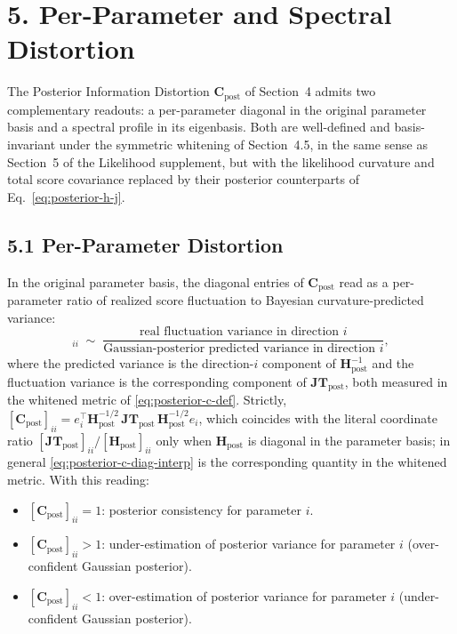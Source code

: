 \documentclass[11pt]{article}
\begin{document}
\section*{5. Per-Parameter and Spectral Distortion}

The Posterior Information Distortion $\mathbf C_{\mathrm{post}}$ of Section~4 admits two complementary readouts: a per-parameter diagonal in the original parameter basis and a spectral profile in its eigenbasis. Both are well-defined and basis-invariant under the symmetric whitening of Section~4.5, in the same sense as Section~5 of the Likelihood supplement, but with the likelihood curvature and total score covariance replaced by their posterior counterparts of Eq.~\eqref{eq:posterior-h-j}.

\subsection*{5.1 Per-Parameter Distortion}

In the original parameter basis, the diagonal entries of $\mathbf C_{\mathrm{post}}$ read as a per-parameter ratio of realized score fluctuation to Bayesian curvature-predicted variance:
\begin{equation}
[\mathbf C_{\mathrm{post}}]_{ii}
\;\sim\;
\frac{\text{real fluctuation variance in direction } i}
     {\text{Gaussian-posterior predicted variance in direction } i},
\label{eq:posterior-c-diag-interp}
\end{equation}
where the predicted variance is the direction-$i$ component of $\mathbf H_{\mathrm{post}}^{-1}$ and the fluctuation variance is the corresponding component of $\mathbf{JT}_{\mathrm{post}}$, both measured in the whitened metric of \eqref{eq:posterior-c-def}. Strictly, $[\mathbf C_{\mathrm{post}}]_{ii} = e_i^\top \mathbf H_{\mathrm{post}}^{-1/2}\, \mathbf{JT}_{\mathrm{post}}\, \mathbf H_{\mathrm{post}}^{-1/2} e_i$, which coincides with the literal coordinate ratio $[\mathbf{JT}_{\mathrm{post}}]_{ii}/[\mathbf H_{\mathrm{post}}]_{ii}$ only when $\mathbf H_{\mathrm{post}}$ is diagonal in the parameter basis; in general \eqref{eq:posterior-c-diag-interp} is the corresponding quantity in the whitened metric. With this reading:
\begin{itemize}
\item $[\mathbf C_{\mathrm{post}}]_{ii} = 1$: posterior consistency for parameter $i$.
\item $[\mathbf C_{\mathrm{post}}]_{ii} > 1$: under-estimation of posterior variance for parameter $i$ (over-confident Gaussian posterior).
\item $[\mathbf C_{\mathrm{post}}]_{ii} < 1$: over-estimation of posterior variance for parameter $i$ (under-confident Gaussian posterior).
\end{itemize}
\end{document}
